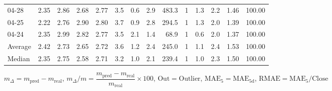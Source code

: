 \begin{threeparttable}
{\begin{tabular}{lrrrrrrrrrrrrr}
  04-28 &          2.35 &          2.86 &          2.68 &        2.77 &                 3.5 &                 0.6 &        2.9 &        483.3 &              1 &                 1.3 &              2.2 &            1.46 &                 100.00 \\
  04-25 &          2.22 &          2.76 &          2.90 &        2.80 &                 3.7 &                 0.9 &        2.8 &        294.5 &              1 &                 1.3 &              2.0 &            1.39 &                 100.00 \\
  04-24 &          2.35 &          2.99 &          2.82 &        2.77 &                 3.5 &                 2.1 &        1.4 &         68.9 &              1 &                 0.6 &              2.0 &            1.37 &                 100.00 \\
Average &          2.42 &          2.73 &          2.65 &        2.72 &                 3.6 &                 1.2 &        2.4 &        245.0 &              1 &                 1.1 &              2.4 &            1.53 &                 100.00 \\
 Median &          2.35 &          2.75 &          2.58 &        2.71 &                 3.2 &                 1.0 &        2.1 &        239.4 &              1 &                 1.0 &              2.3 &            1.50 &                 100.00 \\
\bottomrule
\end{tabular}
}
\begin{tablenotes}\footnotesize
\item $m_\Delta=m_{\text{pred}}-m_{\text{real}}$,
$m_\Delta/m=\dfrac{m_{\text{pred}}-m_{\text{real}}}{m_{\text{real}}}\times100$,
$\mathrm{Out}=\text{Outlier}$,
$\mathrm{MAE}_5=\mathrm{MAE}_{5\text{d}}$,
$\mathrm{RMAE}=\mathrm{MAE}_5/\text{Close}$
\end{tablenotes}
\end{threeparttable}
\endgroup


